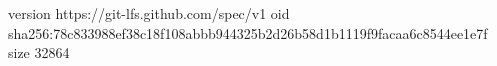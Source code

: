 version https://git-lfs.github.com/spec/v1
oid sha256:78c833988ef38c18f108abbb944325b2d26b58d1b1119f9facaa6c8544ee1e7f
size 32864
